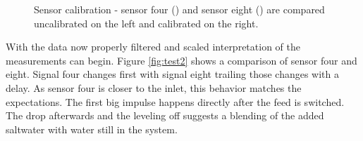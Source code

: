 \begin{figure}[H]
	\begin{center}
		\caption{Sensor calibration - sensor four (\drawline[blue]) and sensor eight (\drawline[red]) are compared uncalibrated on the left and calibrated on the right.}
		\label{fig:test2_37_adj}
	\end{center}
\end{figure}

With the data now properly filtered and scaled interpretation of the measurements can begin. Figure \ref{fig:test2} shows a comparison of sensor four and eight. Signal four changes first with signal eight trailing those changes with a delay. As sensor four is closer to the inlet, this behavior matches the expectations. The first big impulse happens directly after the feed is switched. The drop afterwards and the leveling off suggests a blending of the added saltwater with water still in the system.

